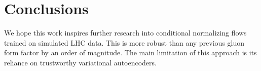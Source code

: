 \section{Conclusions}\label{sec:conclusions}

We hope this work inspires further research into conditional normalizing
flows trained on simulated LHC data. This is more robust than any
previous gluon form factor by an order of magnitude. The main limitation
of this approach is its reliance on trustworthy variational
autoencoders.

